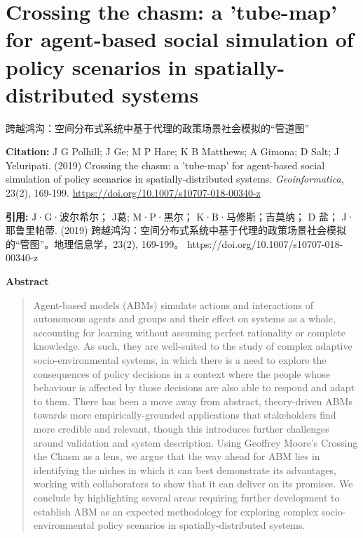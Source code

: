 \vspace{0.5em}


\chapter{Crossing the chasm: a 'tube-map' for agent-based social simulation of policy scenarios in spatially-distributed systems}
\begin{center}\small 跨越鸿沟：空间分布式系统中基于代理的政策场景社会模拟的“管道图”\end{center}

\noindent\textbf{Citation:} J G Polhill; J Ge; M P Hare; K B Matthews; A Gimona; D Salt; J Yeluripati. (2019) Crossing the chasm: a 'tube-map' for agent-based social simulation of policy scenarios in spatially-distributed systems. \textit{Geoinformatica}, 23(2), 169-199. \url{https://doi.org/10.1007/s10707-018-00340-z}

\vspace{0.5em}
\noindent\textbf{引用:} J·G·波尔希尔； J葛; M·P·黑尔； K·B·马修斯；吉莫纳； D 盐； J·耶鲁里帕蒂. (2019) 跨越鸿沟：空间分布式系统中基于代理的政策场景社会模拟的“管图”。地理信息学，23(2), 169-199。 https://doi.org/10.1007/s10707-018-00340-z

\vspace{1.5em}
\noindent\textbf{Abstract}\par
\begin{quote}\small
Agent-based models (ABMs) simulate actions and interactions of autonomous agents and groups and their effect on systems as a whole, accounting for learning without assuming perfect rationality or complete knowledge. As such, they are well-suited to the study of complex adaptive socio-environmental systems, in which there is a need to explore the consequences of policy decisions in a context where the people whose behaviour is affected by those decisions are also able to respond and adapt to them. There has been a move away from abstract, theory-driven ABMs towards more empirically-grounded applications that stakeholders find more credible and relevant, though this introduces further challenges around validation and system description. Using Geoffrey Moore's Crossing the Chasm as a lens, we argue that the way ahead for ABM lies in identifying the niches in which it can best demonstrate its advantages, working with collaborators to show that it can deliver on its promises. We conclude by highlighting several areas requiring further development to establish ABM as an expected methodology for exploring complex socio-environmental policy scenarios in spatially-distributed systems.
\end{quote}

